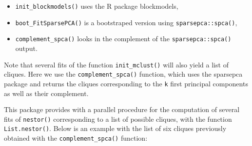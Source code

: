 \begin{itemize}
\tightlist
\item
  \texttt{init\_blockmodels()} uses the R package blockmodels,
\item
  \texttt{boot\_FitSparsePCA()} is a bootstraped version using
  \texttt{sparsepca::spca()},
\item
  \texttt{complement\_spca()} looks in the complement of the
  \texttt{sparsepca::spca()} output.
\end{itemize}

Note that several fits of the function \texttt{init\_mclust()} will also yield a list of cliques. Here we use the \texttt{complement\_spca()} function, which uses the sparsepca package and returns the cliques corresponding to the
\texttt{k} first principal components as well as their complement.

\begin{Shaded}
\begin{Highlighting}[]
\StringTok{ }\OperatorTok{\$}\NormalTok{) }
\CommentTok{#> [[1]]}
\CommentTok{#> [[1]][[1]]}
\CommentTok{#> }
\CommentTok{#> [[2]]}
\CommentTok{#> [[2]][[1]]}
\CommentTok{#> }
\CommentTok{#> [[3]]}
\CommentTok{#> [[3]][[1]]}
\CommentTok{#> }
\CommentTok{#> [[4]]}
\CommentTok{#> [[4]][[1]]}
\CommentTok{#> }
\CommentTok{#> [[5]]}
\CommentTok{#> [[5]][[1]]}
\CommentTok{#> }
\CommentTok{#> [[6]]}
\CommentTok{#> [[6]][[1]]}
\end{Highlighting}
\end{Shaded}

This package provides with a parallel procedure for the computation of
several fits of \texttt{nestor()} corresponding to a list of possible
cliques, with the function \texttt{List.nestor()}. Below is an example
with the list of six cliques previously obtained with the
\texttt{complement\_spca()} function:

\begin{Shaded}
\begin{Highlighting}[]
\OperatorTok{\$}\NormalTok{,}
\NormalTok{,}  \NormalTok{, }\NormalTok{, }\NormalTok{)}
\end{Highlighting}
\end{Shaded}

